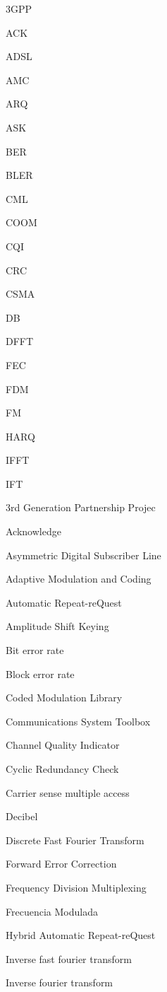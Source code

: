 \begin{enumerate}
    \begin{minipage}{0.2\linewidth}   
      \item[] 3GPP
      \item[] ACK
      \item[] ADSL
      \item[] AMC
      \item[] ARQ
      \item[] ASK
      \item[] BER
      \item[] BLER
      \item[] CML
      \item[] COOM
      \item[] CQI
      \item[] CRC
      \item[] CSMA
      \item[] DB
      \item[] DFFT
      \item[] FEC
      \item[] FDM
      \item[] FM
      \item[] HARQ
      \item[] IFFT
      \item[] IFT
      
    
  	\end{minipage}
  	\begin{minipage}{0.7\linewidth}
      \item[] 3rd Generation Partnership Projec
      \item[] Acknowledge
      \item[] Asymmetric Digital Subscriber Line
      \item[] Adaptive Modulation and Coding
      \item[] Automatic Repeat-reQuest
      \item[] Amplitude Shift Keying
      \item[] Bit error rate
      \item[] Block error rate
      \item[] Coded Modulation Library
      \item[] Communications System Toolbox 
      \item[] Channel Quality Indicator
      \item[] Cyclic Redundancy Check
      \item[] Carrier sense multiple access
      \item[] Decibel
      \item[] Discrete Fast Fourier Transform
      \item[] Forward Error Correction
      \item[] Frequency Division Multiplexing
      \item[] Frecuencia Modulada
      \item[] Hybrid Automatic Repeat-reQuest
      \item[] Inverse fast fourier transform
      \item[] Inverse fourier transform
      

\end{minipage}
\end{enumerate}
